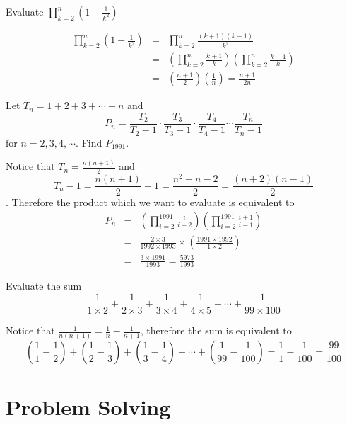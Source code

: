 \begin{exmp}   Evaluate $\displaystyle \prod_{k=2}^{n}\left(1-\frac{1}{k^2}\right)$  \end{exmp}
\begin{soln}  
\begin{eqnarray*} \prod_{k=2}^{n}\left(1-\frac{1}{k^2}\right) &=& \prod_{k=2}^{n}\frac{(k+1)(k-1)}{k^2} \\ &=& \left(\prod_{k=2}^{n}\frac{k+1}{k}\right)\left(\prod_{k=2}^{n}\frac{k-1}{k}\right) \\ &=& \left(\frac{n+1}{2}\right)\left(\frac{1}{n}\right)=\frac{n+1}{2n} \end{eqnarray*}  \end{soln}

\begin{exmp}[AMC 12] Let $T_n=1+2+3+\cdots+n$ and $$P_n=\frac{T_2}{T_2-1}\cdot \frac{T_3}{T_3-1}\cdot \frac{T_4}{T_4-1}\cdots \frac{T_n}{T_n-1}$$ for $n=2,3,4,\cdots$.  Find $P_{1991}$. \end{exmp}  
\begin{soln} 
Notice that $T_n=\frac{n(n+1)}{2}$ and $$T_n-1=\frac{n(n+1)}{2}-1=\frac{n^2+n-2}{2}=\frac{(n+2)(n-1)}{2}$$.  Therefore the product which we want to evaluate is equivalent to
\begin{eqnarray*} P_n&=&\left(\prod_{i=2}^{1991}\frac{i}{i+2}\right)\left(\prod_{i=2}^{1991}\frac{i+1}{i-1}\right) \\ &=& \frac{2\times 3}{1992\times 1993}\times \left(\frac{1991\times 1992}{1\times 2}\right) \\ &=& \frac{3\times 1991}{1993}=\frac{5973}{1993} \end{eqnarray*} \end{soln}

\begin{exmp}  Evaluate the sum $$\frac{1}{1\times 2}+\frac{1}{2\times 3}+\frac{1}{3\times 4}+\frac{1}{4\times 5}+\cdots +\frac{1}{99\times 100}$$ \end{exmp}
\begin{soln}  
Notice that $\displaystyle \frac{1}{n(n+1)}=\frac{1}{n}-\frac{1}{n+1}$, therefore the sum is equivalent to 
$$\left(\frac11-\frac12\right)+\left(\frac12-\frac13\right)+\left(\frac13-\frac14\right)+\cdots+\left(\frac{1}{99}-\frac{1}{100}\right)= \frac11-\frac{1}{100}=\frac{99}{100}$$

\end{soln}



\section{Problem Solving}

